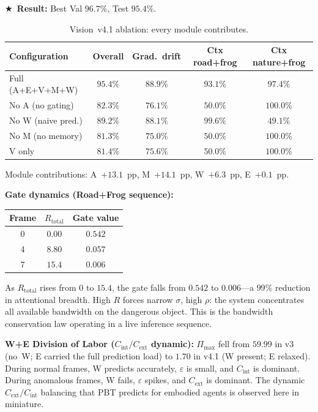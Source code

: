 \documentclass[12pt,a4paper]{article}
\newcommand{\Rtot}{R_{\mathrm{total}}}
\newcommand{\Cext}{C_{\mathrm{ext}}}
\newcommand{\Cint}{C_{\mathrm{int}}}
\newcommand{\starred}{\textbf{\textcolor{pbtblue}{$\bigstar$}}~}
\begin{document}
\starred\textbf{Result:} Best Val $96.7\%$, Test $95.4\%$.

\begin{table}[ht]
\centering
\caption{Vision~v4.1 ablation: every module contributes.}
\label{tab:v41_ablation}
\small
\begin{tabular}{@{}lcccc@{}}
\toprule
\textbf{Configuration} & \textbf{Overall}
  & \textbf{Grad.\ drift} & \textbf{Ctx road+frog} & \textbf{Ctx nature+frog}\\
\midrule
Full (A+E+V+M+W) & $95.4\%$ & $88.9\%$ & $93.1\%$ & $97.4\%$ \\
No A (no gating) & $82.3\%$ & $76.1\%$ & $50.0\%$ & $100.0\%$ \\
No W (naive pred.) & $89.2\%$ & $88.1\%$ & $99.6\%$ & $49.1\%$ \\
No M (no memory) & $81.3\%$ & $75.0\%$ & $50.0\%$ & $100.0\%$ \\
V only           & $81.4\%$ & $75.6\%$ & $50.0\%$ & $100.0\%$ \\
\bottomrule
\end{tabular}
\end{table}

Module contributions: A~$+13.1$~pp, M~$+14.1$~pp, W~$+6.3$~pp, E~$+0.1$~pp.

\textbf{Gate dynamics (Road+Frog sequence):}

\begin{center}
\begin{tabular}{@{}ccc@{}}
\toprule
Frame & $R_{\mathrm{total}}$ & Gate value \\
\midrule
0 & $0.00$  & $0.542$ \\
4 & $8.80$  & $0.057$ \\
7 & $15.4$  & $0.006$ \\
\bottomrule
\end{tabular}
\end{center}

As $\Rtot$ rises from $0$ to $15.4$, the gate falls from $0.542$ to
$0.006$---a $99\%$ reduction in attentional breadth. High $R$ forces narrow
$\sigma$, high $\rho$: the system concentrates all available bandwidth on the
dangerous object. This is the bandwidth conservation law operating in a live
inference sequence.

\textbf{W+E Division of Labor ($\Cint/\Cext$ dynamic):} $\Pi_{\max}$ fell
from $59.99$ in v3 (no~W; E carried the full prediction load) to $1.70$ in
v4.1 (W present; E relaxed). During normal frames, W predicts accurately,
$\varepsilon$ is small, and $\Cint$ is dominant. During anomalous frames,
W fails, $\varepsilon$ spikes, and $\Cext$ is dominant. The dynamic
$\Cext/\Cint$ balancing that PBT predicts for embodied agents is observed
here in miniature.
\end{document}
